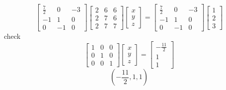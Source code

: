 \begin{example}
	\[\begin{bmatrix} \frac{7}{2} & 0 & -3 \\ -1 & 1 & 0 \\ 0 & -1 & 0 \end{bmatrix} \begin{bmatrix} 2 & 6 & 6 \\ 2 & 7 & 6 \\ 2 & 7 & 7 \end{bmatrix} \begin{bmatrix} x \\ y \\ z  \end{bmatrix} = \begin{bmatrix} \frac{7}{2} & 0 & -3 \\ -1 & 1 & 0 \\ 0 & -1 & 0 \end{bmatrix} \begin{bmatrix} 1 \\ 2 \\ 3 \end{bmatrix} \]
	check
	\[\begin{bmatrix} 1 & 0 & 0 \\ 0 & 1 & 0 \\ 0 & 0 & 1 \end{bmatrix} \begin{bmatrix} x \\ y \\ z \end{bmatrix} = \begin{bmatrix} -\frac{11}{2} \\ 1 \\ 1 \end{bmatrix}  \]
	\[\boxed{\left(  -\frac{11}{2}, 1, 1 \right)}\]
\end{example}

